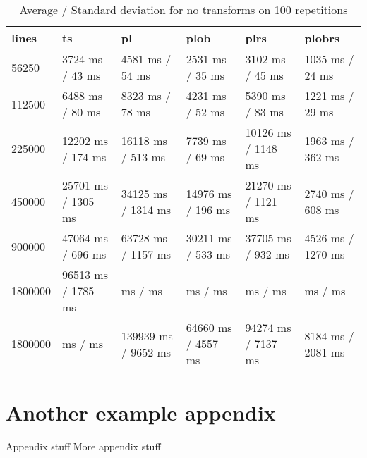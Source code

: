 \begin{table}[ht]
	\caption{Average / Standard deviation for no transforms on 100 repetitions}
	\label{tab:eval:none}
	\begin{tabular}{|l|l|l|l|l|l|}
		\hline
		lines   & ts                 & pl                  & plob               & plrs               & plobrs            \\
		\hline
		56250   & 3724 ms / 43 ms    & 4581 ms / 54 ms     & 2531 ms / 35 ms    & 3102 ms / 45 ms    & 1035 ms / 24 ms   \\
		112500  & 6488 ms / 80 ms    & 8323 ms / 78 ms     & 4231 ms / 52 ms    & 5390 ms / 83 ms    & 1221 ms / 29 ms   \\
		225000  & 12202 ms / 174 ms  & 16118 ms / 513 ms   & 7739 ms / 69 ms    & 10126 ms / 1148 ms & 1963 ms / 362 ms  \\
		450000  & 25701 ms / 1305 ms & 34125 ms / 1314 ms  & 14976 ms / 196 ms  & 21270 ms / 1121 ms & 2740 ms / 608 ms  \\
		900000  & 47064 ms / 696 ms  & 63728 ms / 1157 ms  & 30211 ms / 533 ms  & 37705 ms / 932 ms  & 4526 ms / 1270 ms \\
		1800000 & 96513 ms / 1785 ms & ms /  ms            & ms / ms            & ms / ms            & ms / ms           \\
		\hline
		1800000 & ms /  ms           & 139939 ms / 9652 ms & 64660 ms / 4557 ms & 94274 ms / 7137 ms & 8184 ms / 2081 ms \\
		\hline
	\end{tabular}
\end{table}








\pagebreak
\section{Another example appendix}
\label{appendix:example2}
\newpage
Appendix stuff
\newpage
More appendix stuff
